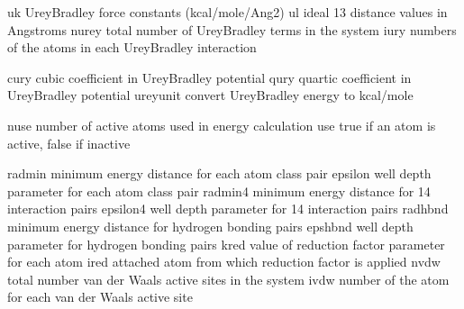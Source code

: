 \documentclass[letterpaper,11pt,english]{sphinxmanual}
\begin{document}

\begin{sphinxVerbatim}[commandchars=\\\{\}]
uk              Urey\PYGZhy{}Bradley force constants (kcal/mole/Ang\PYGZca{}2)
ul              ideal 1\PYGZhy{}3 distance values in Angstroms
nurey           total number of Urey\PYGZhy{}Bradley terms in the system
iury            numbers of the atoms in each Urey\PYGZhy{}Bradley interaction
\end{sphinxVerbatim}


\begin{sphinxVerbatim}[commandchars=\\\{\}]
cury            cubic coefficient in Urey\PYGZhy{}Bradley potential
qury            quartic coefficient in Urey\PYGZhy{}Bradley potential
ureyunit        convert Urey\PYGZhy{}Bradley energy to kcal/mole
\end{sphinxVerbatim}


\begin{sphinxVerbatim}[commandchars=\\\{\}]
nuse            number of active atoms used in energy calculation
use             true if an atom is active, false if inactive
\end{sphinxVerbatim}


\begin{sphinxVerbatim}[commandchars=\\\{\}]
radmin          minimum energy distance for each atom class pair
epsilon         well depth parameter for each atom class pair
radmin4         minimum energy distance for 1\PYGZhy{}4 interaction pairs
epsilon4        well depth parameter for 1\PYGZhy{}4 interaction pairs
radhbnd         minimum energy distance for hydrogen bonding pairs
epshbnd         well depth parameter for hydrogen bonding pairs
kred            value of reduction factor parameter for each atom
ired            attached atom from which reduction factor is applied
nvdw            total number van der Waals active sites in the system
ivdw            number of the atom for each van der Waals active site
\end{sphinxVerbatim}
\end{document}

